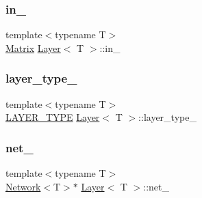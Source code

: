 \mbox{\label{class_layer_a9482c992e218f5da65c4345be1dd7447}} 
\subsubsection{\texorpdfstring{in\_}{in\_}}
{\footnotesize\ttfamily template$<$typename T$>$ \\
\mbox{\hyperlink{class_layer_a22b1e7286096aa62bd245536c8ebdaf1}{Matrix}} \mbox{\hyperlink{class_layer}{Layer}}$<$ T $>$\+::in\+\_\+\hspace{0.3cm}{\ttfamily [protected]}}

\mbox{\label{class_layer_af60ad69b5833427d6a6a4d49db902d76}} 
\subsubsection{\texorpdfstring{layer\_type\_}{layer\_type\_}}
{\footnotesize\ttfamily template$<$typename T$>$ \\
\mbox{\hyperlink{layer__base_8hpp_a5f7e99058765b058df158c099200b154}{L\+A\+Y\+E\+R\+\_\+\+T\+Y\+PE}} \mbox{\hyperlink{class_layer}{Layer}}$<$ T $>$\+::layer\+\_\+type\+\_\+\hspace{0.3cm}{\ttfamily [protected]}}

\mbox{\label{class_layer_a5c55f43a191e4fed38002316ca71b4ff}} 
\subsubsection{\texorpdfstring{net\_}{net\_}}
{\footnotesize\ttfamily template$<$typename T$>$ \\
\mbox{\hyperlink{class_network}{Network}}$<$T$>$$\ast$ \mbox{\hyperlink{class_layer}{Layer}}$<$ T $>$\+::net\+\_\+\hspace{0.3cm}{\ttfamily [protected]}}

\mbox{\label{class_layer_a1dd882f1ce286b7d36aa4d14c815b2d3}} 
